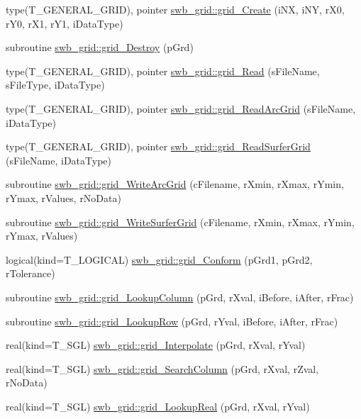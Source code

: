 \begin{DoxyCompactItemize}
\item 
type(T\_\-GENERAL\_\-GRID), pointer \hyperlink{namespaceswb__grid_a961bb54be48e77d8d35cb822379f4e60}{swb\_\-grid::grid\_\-Create} (iNX, iNY, rX0, rY0, rX1, rY1, iDataType)
\item 
subroutine \hyperlink{namespaceswb__grid_a42bbda135d21221339b4b6656da28933}{swb\_\-grid::grid\_\-Destroy} (pGrd)
\item 
type(T\_\-GENERAL\_\-GRID), pointer \hyperlink{namespaceswb__grid_a99ec16225afef63a0e34f4882ee3250f}{swb\_\-grid::grid\_\-Read} (sFileName, sFileType, iDataType)
\item 
type(T\_\-GENERAL\_\-GRID), pointer \hyperlink{namespaceswb__grid_a3a3408da7876ea041fba69415cbbab94}{swb\_\-grid::grid\_\-ReadArcGrid} (sFileName, iDataType)
\item 
type(T\_\-GENERAL\_\-GRID), pointer \hyperlink{namespaceswb__grid_aa0df2bc020bca54470db5468f6a026a0}{swb\_\-grid::grid\_\-ReadSurferGrid} (sFileName, iDataType)
\item 
subroutine \hyperlink{namespaceswb__grid_a9d60759cd038c3d1936d912299e2f4a2}{swb\_\-grid::grid\_\-WriteArcGrid} (cFilename, rXmin, rXmax, rYmin, rYmax, rValues, rNoData)
\item 
subroutine \hyperlink{namespaceswb__grid_aaf1f4ad8065d88804760ea3d28fb2e02}{swb\_\-grid::grid\_\-WriteSurferGrid} (cFilename, rXmin, rXmax, rYmin, rYmax, rValues)
\item 
logical(kind=T\_\-LOGICAL) \hyperlink{namespaceswb__grid_ada2d0ba491d29a4a52aae2822b888f1f}{swb\_\-grid::grid\_\-Conform} (pGrd1, pGrd2, rTolerance)
\item 
subroutine \hyperlink{namespaceswb__grid_ab16578a0a4a5254a39601c1051e486d2}{swb\_\-grid::grid\_\-LookupColumn} (pGrd, rXval, iBefore, iAfter, rFrac)
\item 
subroutine \hyperlink{namespaceswb__grid_a20f18afc3ec94624f31f66f3641a73a8}{swb\_\-grid::grid\_\-LookupRow} (pGrd, rYval, iBefore, iAfter, rFrac)
\item 
real(kind=T\_\-SGL) \hyperlink{namespaceswb__grid_ac85aae6e574c3fb99358cf1e61fb6baf}{swb\_\-grid::grid\_\-Interpolate} (pGrd, rXval, rYval)
\item 
real(kind=T\_\-SGL) \hyperlink{namespaceswb__grid_a36a5dae5d73e58c86a5f71557e9dc7ec}{swb\_\-grid::grid\_\-SearchColumn} (pGrd, rXval, rZval, rNoData)
\item 
real(kind=T\_\-SGL) \hyperlink{namespaceswb__grid_a3309310bf2adef11b8a265a7c19faf8d}{swb\_\-grid::grid\_\-LookupReal} (pGrd, rXval, rYval)

\end{DoxyCompactItemize}
